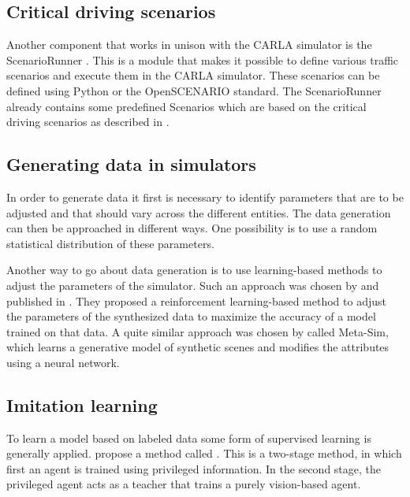 \documentclass[conference, 11pt]{IEEEtran}
\begin{document}
\subsection{Critical driving scenarios}

Another component that works in unison with the CARLA simulator is the ScenarioRunner \cite{CARLA:ScenarioRunner}.
This is a module that makes it possible to define various traffic scenarios and execute them in the CARLA simulator.
These scenarios can be defined using Python or the OpenSCENARIO \cite{OpenScenario} standard.
The ScenarioRunner already contains some predefined Scenarios which are based on the critical driving scenarios as described in  \cite{NHTSA:PreCrashScenarios}.

\subsection{Generating data in simulators}

In order to generate data it first is necessary to identify parameters that are to be adjusted and that should vary across the different entities.
The data generation can then be approached in different ways.
One possibility is to use a random statistical distribution of these parameters. 

Another way to go about data generation is to use learning-based methods to adjust the parameters of the simulator.
Such an approach was chosen by \citeauthor{DBLP:LearningToSimulate} and published in  \cite{DBLP:LearningToSimulate}.
They proposed a reinforcement learning-based method to adjust the parameters of the synthesized data to maximize the accuracy of a model trained on that data.
A quite similar approach was chosen by \citeauthor{DBLP:Meta-Sim} \cite{DBLP:Meta-Sim} called Meta-Sim, which learns a generative model of synthetic scenes and modifies the attributes using a neural network.

\subsection{Imitation learning}

To learn a model based on labeled data some form of supervised learning is generally applied.
\citeauthor{Chen:LearningByCheating} propose a method called  \cite{Chen:LearningByCheating}.
This is a two-stage method, in which first an agent is trained using privileged information.
In the second stage, the privileged agent acts as a teacher that trains a purely vision-based agent.
\end{document}
